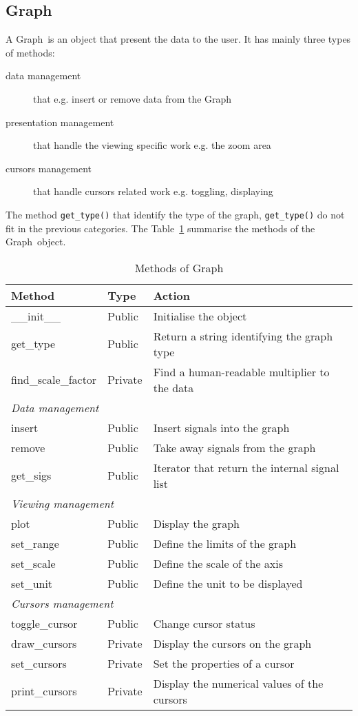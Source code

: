 \documentclass[a4paper,11pt]{article}
\newcommand{\meth}[1]{\texttt{#1()}}
\newcommand{\cls}[1]{\textsf{#1}}
\newcommand{\graph}{\cls{Graph}}
\begin{document}
\subsection{Graph}
\label{sec:graphs:graph}
A \graph\ is an object that present the data to the user.
It has mainly three types of methods:
\begin{description}
\item[data management] that e.g. insert or remove data from the \graph
\item[presentation management] that handle the viewing specific work e.g. the zoom area
\item[cursors management] that handle cursors related work e.g. toggling, displaying
\end{description}
The method \meth{get\_type} that identify the type of the graph, \meth{get\_type} do not fit in the previous categories.
The Table~\ref{tab:graphs:meth} summarise the methods of the \graph\ object.
\begin{table}[htbp]
  \centering\sf\small
  \begin{tabular}{lll}
    \hline
    Method & Type & Action \\
    \hline
    \_\_init\_\_ & Public & Initialise the object \\
    get\_type & Public & Return a string identifying the graph type\\
    find\_scale\_factor & Private & Find a human-readable multiplier to the data \\
    \multicolumn{3}{l}{\textit{Data management}} \\
    insert & Public & Insert signals into the graph\\
    remove & Public & Take away signals from the graph\\
    get\_sigs & Public & Iterator that return the internal signal list\\
    \multicolumn{3}{l}{\textit{Viewing management}} \\
    plot & Public & Display the graph\\
    set\_range & Public & Define the limits of the graph\\
    set\_scale & Public & Define the scale of the axis\\
    set\_unit & Public & Define the unit to be displayed\\
    \multicolumn{3}{l}{\textit{Cursors management}} \\
    toggle\_cursor & Public & Change cursor status \\
    draw\_cursors & Private & Display the cursors on the graph\\
    set\_cursors & Private & Set the properties of a cursor\\
    print\_cursors & Private & Display the numerical values of the cursors\\
    \hline
  \end{tabular}
  \caption{Methods of \graph}
  \label{tab:graphs:meth}
\end{table}
\end{document}
